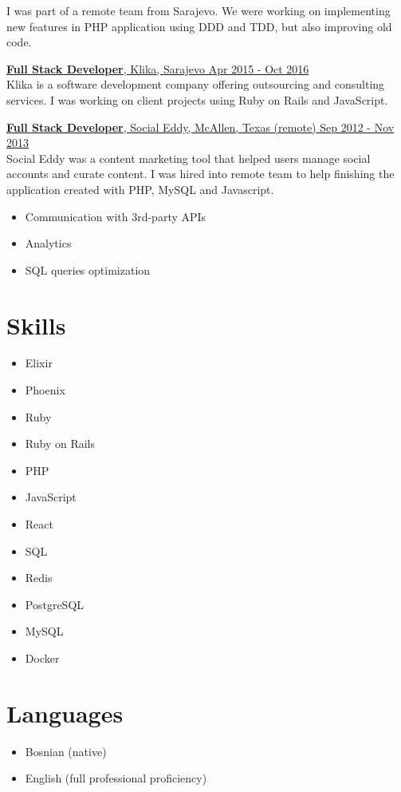 \documentclass[margin]{res}
\begin{document}
\begin{resume}
I was part of a remote team from Sarajevo. We were working on implementing
new features in PHP application using DDD and TDD, but also improving old code.

\uline{{\bf Full Stack Developer}, Klika, Sarajevo
  \hfill Apr 2015 - Oct 2016}\vspace{3pt}\\
Klika is a software development company offering outsourcing and consulting services. I was working on client projects using Ruby on Rails and JavaScript.

\uline{{\bf Full Stack Developer}, Social Eddy, McAllen, Texas (remote)
  \hfill Sep 2012 - Nov 2013}\vspace{3pt}\\
Social Eddy was a content marketing tool that helped users manage social accounts and curate content. I was hired into remote team to help finishing the application created with PHP, MySQL and Javascript.
\vspace{3pt}
\begin{itemize} \itemsep -1pt %
  \item Communication with 3rd-party APIs
  \item Analytics
  \item SQL queries optimization
\end{itemize}


\section{Skills}
\begin{multicols}{3}
  \begin{itemize}[label={}, leftmargin=0cm, itemsep=0cm]
      \item Elixir
  \item Phoenix
  \item Ruby
  \item Ruby on Rails
  \item PHP
  \item JavaScript
  \item React
  \item SQL
  \item Redis
  \item PostgreSQL
  \item MySQL
  \item Docker
  \end{itemize}
\end{multicols}

\section{Languages}
\begin{itemize}[label={}, leftmargin=0cm, itemsep=0cm]
  \item Bosnian (native)
  \item English (full professional proficiency)
\end{itemize}

\end{resume}
\end{document}
